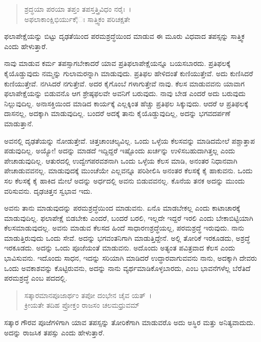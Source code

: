 \begin{verse}
ಶ್ರದ್ಧಯಾ ಪರಯಾ ತಪ್ತಂ ತಪಸ್ತತ್ತ್ರಿವಿಧಂ ನರೈಃ~।\\ಅಫಲಾಕಾಂಕ್ಷಿಭಿರ್ಯುಕೆ¦ಃ ಸಾತ್ತ್ವಿಕಂ ಪರಿಚಕ್ಷತೇ 
\end{verse}

{\small ಫಲಾಪೇಕ್ಷೆಯನ್ನು ಬಿಟ್ಟು ದೃಢತೆಯಿಂದ ಪರಮಶ್ರದ್ಧೆಯಿಂದ ಮಾಡುವ ಈ ಮೂರು ವಿಧವಾದ ತಪಸ್ಸನ್ನು ಸಾತ್ತ್ವಿಕ ಎಂದು ಹೇಳುತ್ತಾರೆ.}

ನಾವು ಮಾಡುವ ಕರ್ಮ ತಪಸ್ಸಾಗಬೇಕಾದರೆ ಯಾವ ಪ್ರತಿಫಲಾಪೇಕ್ಷೆಯನ್ನೂ ಬಯಸಬಾರದು. ಪ್ರತಿಫಲಕ್ಕೆ ಕೈಯೊಡ್ಡುವುದು ನಮ್ಮನ್ನು ಗುಲಾಮರನ್ನಾಗಿ ಮಾಡುವುದು. ಪ್ರತಿಫಲ ಹೇಳಿದಂತೆ ಕುಣಿಯುತ್ತೇವೆ. ಅದು ಕುಣಿಸಿದರೆ ಕುಣಿಯುತ್ತೇವೆ. ನಗಿಸಿದರೆ ನಗುತ್ತೇವೆ. ಅದರ ಕೈಗೊಂಬೆ ಗಳಾಗುತ್ತೇವೆ ನಾವು. ಕೆಲಸ ಮಾಡುವವನು ಯಾವಾಗ ಫಲಾಪೇಕ್ಷೆಯನ್ನು ಬಿಡುವನೊ ಆಗ ಶ್ರೇಷ್ಠಫಲವೇ ಅವನಿಗೆ ಬರುವುದು. ನಾವು ಬೇಡ ಎಂದರೆ ಅದು ಬರುವುದು ನಿಲ್ಲುವುದಿಲ್ಲ. ಅನಾಸಕ್ತಿಯಿಂದ ಮಾಡಿದ ಕಾರ್ಯಕ್ಕೆ ಎಲ್ಲಕ್ಕಿಂತ ಹೆಚ್ಚು ಪ್ರತಿಫಲ ಸಿಕ್ಕುವುದು. ಆದರೆ ಆ ಪ್ರತಿಫಲಕ್ಕೆ ದಾಸನಲ್ಲ, ಅದಕ್ಕಾಗಿ ಮಾಡುವುದಿಲ್ಲ. ಬಂದರೆ ಅದಕ್ಕೆ ತಾನು ಕೈಯೊಡ್ಡುವುದಿಲ್ಲ, ಅದನ್ನು ಭಗವದರ್ಪಣೆ ಮಾಡುತ್ತಾನೆ.

ಅವನಲ್ಲಿ ದೃಢತೆಯನ್ನು ನೋಡುತ್ತೇವೆ. ಚಿತ್ತಚಾಂಚಲ್ಯವಿಲ್ಲ. ಒಂದು ಒಳ್ಳೆಯ ಕೆಲಸವನ್ನು ಮಾಡಿದಮೇಲೆ ಪಶ್ಚಾತ್ತಾಪ ಪಡುವುದಿಲ್ಲ. ಅಯ್ಯೋ! ಅದನ್ನು ಮಾಡದೆ ಇದ್ದಿದ್ದರೆ ಇಷ್ಟೊಂದು ಖರ್ಚನ್ನು ಉಳಿಸಬಹುದಾಗಿತ್ತಲ್ಲ ಎಂದು ಪೇಚಾಡುವುದಿಲ್ಲ. ಆತುರದಲ್ಲಿ ಉದ್ವೇಗಪರವಶನಾಗಿ ಒಂದು ಒಳ್ಳೆಯ ಕೆಲಸ ಮಾಡಿ, ಅನಂತರ ನಿಧಾನವಾಗಿ ಪೇಚಾಡುವವನಲ್ಲ. ಮಾಡುವುದಕ್ಕೆ ಮುಂಚೆಯೇ ಎಲ್ಲವನ್ನೂ ಪರಿಶೀಲಿಸಿ ಅನಂತರ ಕೆಲಸಕ್ಕೆ ಕೈ ಹಾಕುವನು. ಒಂದು ಸಲ ಕೆಲಸಕ್ಕೆ ಕೈ ಹಾಕಿದ ಮೇಲೆ ಅದನ್ನು ಅರ್ಧದಲ್ಲಿ ಅವನು ಬಿಡುವವನಲ್ಲ. ಕೊನೆಯ ತನಕ ಅದನ್ನು ಮುಂದು ವರಿಸುವನು. ದೃಢಚಿತ್ತನ ಸ್ವಭಾವ ಇದು.

ಅವನು ತಾನು ಮಾಡುವುದನ್ನು ಪರಮಶ್ರದ್ಧೆಯಿಂದ ಮಾಡುವನು. ಏನೊ ಮಾಡಬೇಕಲ್ಲ ಎಂದು ಕಾಟಾಚಾರಕ್ಕೆ ಮಾಡುವುದಿಲ್ಲ. ಫಲಾಪೇಕ್ಷೆ ಬಿಡಬೇಕು ಎಂದರೆ, ಬಂದರೆ ಬರಲಿ, ಇಲ್ಲದೇ ಇದ್ದರೆ ಇರಲಿ ಎಂದು ಬೇಕಾಬಿಟ್ಟಿಯಾಗಿ ಕೆಲಸಮಾಡುವುದಲ್ಲ. ಅವನು ಮಾಡುವ ಕೆಲಸದ ಹಿಂದೆ ಸಾಧಾರಣಶ್ರದ್ಧೆಯಲ್ಲ, ಪರಮಶ್ರದ್ಧೆ ಇರುವುದು. ನಾನು ಮಾಡುತ್ತಿರುವುದು ಒಂದು ಸೇವೆ. ಅದನ್ನು ಭಗವಂತನಿಗಾಗಿ ಮಾಡುತ್ತಿದ್ದೇನೆ. ಅಲ್ಲಿ ತೋರಿಕೆ ಇರಕೂಡದು, ಅಶ್ರದ್ಧೆ ಇರಕೂಡದು. ಅದನ್ನು ಒಂದು ಪೂಜೆಯಂತೆ ಮಾಡುವನು. ಅದೊಂದು ಅತ್ಯಂತ ಪವಿತ್ರವಾದ ಕೆಲಸ ಎಂದು ಭಾವಿಸುವನು. ಇದೊಂದು ಸಾಧನ, ಇದನ್ನು ಸರಿಯಾಗಿ ಮಾಡಿದರೆ ಉದ್ಧಾರವಾಗುವವನು ನಾನು, ಅದಕ್ಕಾಗಿ ದೇವರು ಒಂದು ಅವಕಾಶವನ್ನು ಕೊಟ್ಟಿರುವನು, ಅದನ್ನು ನಾನು ವ್ಯರ್ಥಮಾಡಿಕೊಳ್ಳಬಾರದು, ಎಂಬ ಭಾವನೆಗಳೆಲ್ಲ ಬೆರೆತಿದೆ ಪರಮಶ್ರದ್ಧೆ ಎಂಬ ಪದದಲ್ಲಿ.

\begin{verse}
ಸತ್ಕಾರಮಾನಪೂಜಾರ್ಥಂ ತಪೋ ದಂಭೇನ ಚೈವ ಯತ್~।\\ಕ್ರೀಯತೇ ತದಿಹ ಪ್ರೋಕ್ತಂ ರಾಜಸಂ ಚಲಮಧ್ರುವಮ್ 
\end{verse}

{\small ಸತ್ಕಾರ ಗೌರವ ಪೂಜೆಗಳಿಗಾಗಿ ಯಾವ ತಪಸ್ಸನ್ನು ತೋರಿಕೆಗಾಗಿ ಮಾಡುವರೊ ಅದು ಅಸ್ಥಿರ ಮತ್ತು ಅನಿತ್ಯವಾದುದು. ಅದನ್ನು ರಾಜಸಿಕ ತಪಸ್ಸು ಎಂದು ಹೇಳುತ್ತಾರೆ.}

